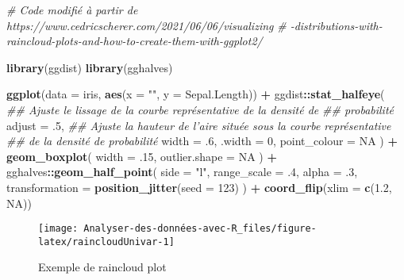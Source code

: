 \documentclass[
  french,
]{book}
\newenvironment{Shaded}{\begin{snugshade}}{\end{snugshade}}
\newcommand{\CommentTok}[1]{\textcolor[rgb]{0.56,0.35,0.01}{\textit{#1}}}
\newcommand{\DataTypeTok}[1]{\textcolor[rgb]{0.13,0.29,0.53}{#1}}
\newcommand{\DecValTok}[1]{\textcolor[rgb]{0.00,0.00,0.81}{#1}}
\newcommand{\FloatTok}[1]{\textcolor[rgb]{0.00,0.00,0.81}{#1}}
\newcommand{\KeywordTok}[1]{\textcolor[rgb]{0.13,0.29,0.53}{\textbf{#1}}}
\newcommand{\NormalTok}[1]{#1}
\newcommand{\OperatorTok}[1]{\textcolor[rgb]{0.81,0.36,0.00}{\textbf{#1}}}
\newcommand{\OtherTok}[1]{\textcolor[rgb]{0.56,0.35,0.01}{#1}}
\newcommand{\StringTok}[1]{\textcolor[rgb]{0.31,0.60,0.02}{#1}}
\begin{document}
\begin{Shaded}
\begin{Highlighting}[]
\CommentTok{# Code modifié à partir de https://www.cedricscherer.com/2021/06/06/visualizing}
\CommentTok{# -distributions-with-raincloud-plots-and-how-to-create-them-with-ggplot2/}

\KeywordTok{library}\NormalTok{(ggdist)}
\KeywordTok{library}\NormalTok{(gghalves)}

\KeywordTok{ggplot}\NormalTok{(}\DataTypeTok{data =}\NormalTok{ iris, }\KeywordTok{aes}\NormalTok{(}\DataTypeTok{x =} \StringTok{""}\NormalTok{, }\DataTypeTok{y =}\NormalTok{ Sepal.Length)) }\OperatorTok{+}\StringTok{ }
\StringTok{  }\NormalTok{ggdist}\OperatorTok{::}\KeywordTok{stat_halfeye}\NormalTok{(}
    \CommentTok{## Ajuste le lissage de la courbe représentative de la densité de }
    \CommentTok{## probabilité}
    \DataTypeTok{adjust =} \FloatTok{.5}\NormalTok{, }
    \CommentTok{## Ajuste la hauteur de l'aire située sous la courbe représentative }
    \CommentTok{## de la densité de probabilité}
    \DataTypeTok{width =} \FloatTok{.6}\NormalTok{, }
    \DataTypeTok{.width =} \DecValTok{0}\NormalTok{, }
    \DataTypeTok{point_colour =} \OtherTok{NA}
\NormalTok{    ) }\OperatorTok{+}\StringTok{ }
\StringTok{  }\KeywordTok{geom_boxplot}\NormalTok{(}
    \DataTypeTok{width =} \FloatTok{.15}\NormalTok{, }
    \DataTypeTok{outlier.shape =} \OtherTok{NA}
\NormalTok{  ) }\OperatorTok{+}
\StringTok{  }\NormalTok{gghalves}\OperatorTok{::}\KeywordTok{geom_half_point}\NormalTok{(}
    \DataTypeTok{side =} \StringTok{"l"}\NormalTok{, }
    \DataTypeTok{range_scale =} \FloatTok{.4}\NormalTok{, }
    \DataTypeTok{alpha =} \FloatTok{.3}\NormalTok{,}
    \DataTypeTok{transformation =} \KeywordTok{position_jitter}\NormalTok{(}\DataTypeTok{seed =} \DecValTok{123}\NormalTok{)}
\NormalTok{  ) }\OperatorTok{+}
\StringTok{  }\KeywordTok{coord_flip}\NormalTok{(}\DataTypeTok{xlim =} \KeywordTok{c}\NormalTok{(}\FloatTok{1.2}\NormalTok{, }\OtherTok{NA}\NormalTok{)) }
\end{Highlighting}
\end{Shaded}

\begin{figure}

{\centering \texttt{[image: Analyser-des-données-avec-R\_files/figure-latex/raincloudUnivar-1]} 

}

\caption{Exemple de raincloud plot}\label{fig:raincloudUnivar}
\end{figure}
\end{document}
